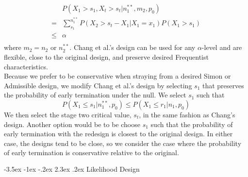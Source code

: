 \documentclass[12pt]{report}\usepackage[]{graphicx}\usepackage[]{color}
\makeatletter
\newlength{\li}\setlength{\li}{14.48pt}
\newlength{\di}\setlength{\di}{-3.5mm}
\renewcommand\subsection{\@startsection {subsection}{2}{\z@}%
                                   {-3.5ex \@plus -1ex \@minus -.2ex}%
                                   {2.3ex \@plus.2ex}%
                                   {\noindent \large \fontfamily{qcs}\selectfont }}
\makeatother
\begin{document}
\begin{equation*}
\begin{aligned}
& P(X_1 > s_1, X_t > s_t | n_1^{\ast\ast}, m_2, p_0) \\
= & \sum_{s_1}^{n_1^{\ast\ast}} P(X_2 > s_t - X_1 | X_1 = x_1) P(X_1 > s_1) \\
 \leq & \alpha \\
\end{aligned}
\end{equation*}
where $m_2 = n_2$ or $n_2^{\ast\ast}$. 
Chang et al.'s design can be used for any $\alpha$-level and are flexible, close to the original design, and preserve desired Frequentist characteristics. \\
Because we prefer to be conservative when straying from a desired Simon or Admissible design, we modify Chang et al.'s design by selecting $s_1$ that preserves the probability of early termination under the null. We select $s_1$ such that $$P(X_1 \leq s_1 | n_1^{\ast\ast}, p_0) \leq P(X_1 \leq r_1 | n_1, p_0)$$ We then select the stage two critical value, $s_t$, in the same fashion as Chang's design. Another option would be to be choose $s_1$ such that the probability of early termination with the redesign is closest to the original design. In either case, the designs tend to be close, so we consider the case where the probability of early termination is conservative relative to the original.   

\subsection{Likelihood Design}
\end{document}
